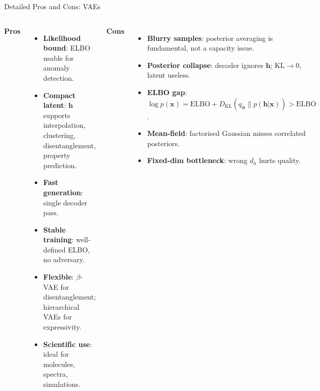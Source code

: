 \documentclass[aspectratio=169,11pt]{beamer}
\newcommand{\DKL}{D_{\mathrm{KL}}}
\newcommand{\bx}{\bm{x}}
\newcommand{\bh}{\bm{h}}
\newcommand{\bphi}{\bm{\phi}}
\begin{document}
\begin{frame}{Detailed Pros and Cons: VAEs}
\begin{columns}[T]
\textcolor{green!60!black}{\textbf{Pros}}
\begin{itemize}\footnotesize\setlength\itemsep{2pt}
  \item \textbf{Likelihood bound}: ELBO usable for anomaly detection.
  \item \textbf{Compact latent}: $\bh$ supports interpolation, clustering,
        disentanglement, property prediction.
  \item \textbf{Fast generation}: single decoder pass.
  \item \textbf{Stable training}: well-defined ELBO, no adversary.
  \item \textbf{Flexible}: $\beta$-VAE for disentanglement;
        hierarchical VAEs for expressivity.
  \item \textbf{Scientific use}: ideal for molecules, spectra, simulations.
\end{itemize}

\textcolor{red!60!black}{\textbf{Cons}}
\begin{itemize}\footnotesize\setlength\itemsep{2pt}
  \item \textbf{Blurry samples}: posterior averaging is fundamental,
        not a capacity issue.
  \item \textbf{Posterior collapse}: decoder ignores $\bh$;
        KL$\to 0$, latent useless.
  \item \textbf{ELBO gap}: $\log p(\bx)=\mathrm{ELBO}+
        \DKL(q_{\bphi}\|p(\bh|\bx))>\mathrm{ELBO}$.
  \item \textbf{Mean-field}: factorised Gaussian misses correlated posteriors.
  \item \textbf{Fixed-dim bottleneck}: wrong $d_h$ hurts quality.
\end{itemize}
\end{columns}
\end{frame}
\end{document}
